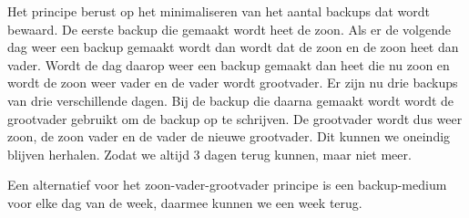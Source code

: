 Het principe berust op het minimaliseren van het aantal backups dat wordt bewaard. De eerste backup die gemaakt wordt heet de zoon. Als er de volgende dag weer een backup gemaakt wordt dan wordt dat de zoon en de zoon heet dan vader. Wordt de dag daarop weer een backup gemaakt dan heet die nu zoon en wordt de zoon weer vader en de vader wordt grootvader. Er zijn nu drie backups van drie verschillende dagen. Bij de backup die daarna gemaakt wordt wordt de grootvader gebruikt om de backup op te schrijven. De grootvader wordt dus weer zoon, de zoon vader en de vader de nieuwe grootvader. Dit kunnen we oneindig blijven herhalen. Zodat we altijd 3 dagen terug kunnen, maar niet meer.

Een alternatief voor het zoon-vader-grootvader principe is een backup-medium voor elke dag van de week, daarmee kunnen we een week terug.


